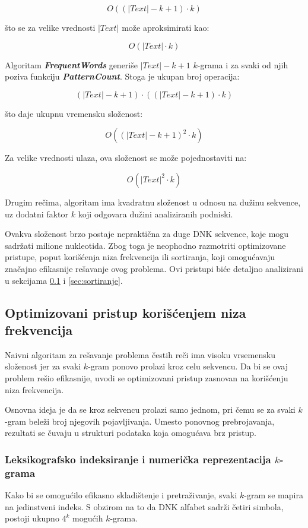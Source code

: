 \documentclass[12pt,oneside]{memoir}
\begin{document}
\[
O((|Text| - k + 1) \cdot k)
\]

što se za velike vrednosti $|Text|$ može aproksimirati kao:

\[
O(|Text| \cdot k)
\]

Algoritam \textit{\textbf{FrequentWords}} generiše $|Text| - k + 1$ $k$-grama i za svaki od njih poziva funkciju \textit{\textbf{PatternCount}}. Stoga je ukupan broj operacija:

\[
(|Text| - k + 1) \cdot ((|Text| - k + 1) \cdot k)
\]

što daje ukupnu vremensku složenost:

\[
O((|Text| - k + 1)^2 \cdot k)
\]

Za velike vrednosti ulaza, ova složenost se može pojednostaviti na:

\[
O(|Text|^2 \cdot k)
\]

Drugim rečima, algoritam ima kvadratnu složenost u odnosu na dužinu sekvence, uz dodatni faktor $k$ koji odgovara dužini analiziranih podniski.

Ovakva složenost brzo postaje nepraktična za duge DNK sekvence, koje mogu sadržati milione nukleotida. Zbog toga je neophodno razmotriti optimizovane pristupe, poput korišćenja niza frekvencija ili sortiranja, koji omogućavaju značajno efikasnije rešavanje ovog problema. Ovi pristupi biće detaljno analizirani u sekcijama \ref{sec:niz_frekvencija} i  \ref{sec:sortiranje}.


\subsection{Optimizovani pristup korišćenjem niza frekvencija}
\label{sec:niz_frekvencija}
Naivni algoritam za rešavanje problema čestih reči ima visoku vrsemensku složenost jer za svaki $k$-gram ponovo prolazi kroz celu sekvencu. Da bi se ovaj problem rešio efikasnije, uvodi se optimizovani pristup zasnovan na korišćenju niza frekvencija.

Osnovna ideja je da se kroz sekvencu prolazi samo jednom, pri čemu se za svaki $k$-gram beleži broj njegovih pojavljivanja. Umesto ponovnog prebrojavanja, rezultati se čuvaju u strukturi podataka koja omogućava brz pristup.


\subsubsection{Leksikografsko indeksiranje i numerička reprezentacija $k$-grama}

Kako bi se omogućilo efikasno skladištenje i pretraživanje, svaki $k$-gram se mapira na jedinstveni indeks. S obzirom na to da DNK alfabet sadrži četiri simbola, postoji ukupno $4^k$ mogućih $k$-grama.
\end{document}
